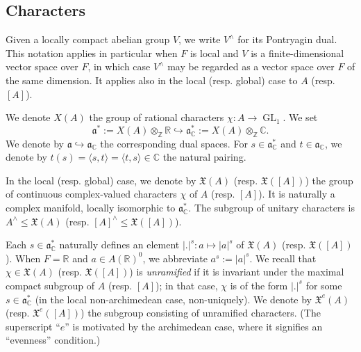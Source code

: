 \documentclass[reqno]{amsart}
\DeclareMathOperator{\GL}{GL}
\theoremstyle{plain} \newtheorem{theorem} {Theorem}
\theoremstyle{definition} \newtheorem{definition} [theorem] {Definition}
\theoremstyle{itplain} %
\numberwithin{equation}{section}
\numberwithin{theorem}{section}
\renewcommand{\leq}{\leqslant}
\begin{document}
\subsection{Characters}
Given a locally compact abelian group $V$, we write $V^\wedge$ for its Pontryagin dual.  This notation applies in particular when $F$ is local and $V$ is a finite-dimensional vector space over $F$, in which case $V^\wedge$ may be regarded as a vector space over $F$ of the same dimension.  It applies also in the local (resp. global) case to $A$ (resp. $[A]$).

We denote $X(A)$ the group of rational characters $\chi : A \rightarrow \GL_1$.  We set
\begin{equation}\label{eq:frak-a-star-X-A}
\mathfrak{a}^* := X(A) \otimes_{\mathbb{Z}} \mathbb{R} \hookrightarrow \mathfrak{a}_{\mathbb{C}}^* := X(A) \otimes_{\mathbb{Z}} \mathbb{C}.
\end{equation}
We denote by $\mathfrak{a} \hookrightarrow \mathfrak{a}_{\mathbb{C}}$ the corresponding dual spaces.  For $s \in \mathfrak{a}_{\mathbb{C}}^*$ and $t \in \mathfrak{a}_{\mathbb{C}}$, we denote by $t(s) = \langle s, t \rangle = \langle t,s  \rangle \in \mathbb{C}$ the natural pairing.

In the local (resp. global) case, we denote  by $\mathfrak{X}(A)$ (resp. $\mathfrak{X}([A])$) the group of continuous complex-valued characters $\chi$ of $A$ (resp. $[A]$).  It is naturally a complex manifold, locally isomorphic to $\mathfrak{a}^*_{\mathbb{C}}$.  The subgroup of unitary characters is $A^\wedge \leq \mathfrak{X}(A)$ (resp. $[A]^\wedge \leq \mathfrak{X}([A])$).

Each $s \in \mathfrak{a}_{\mathbb{C}}^*$ naturally defines an element $|.|^s : a \mapsto |a|^s$ of $\mathfrak{X}(A)$ (resp. $\mathfrak{X}([A])$).  When $F = \mathbb{R}$ and $a \in A(\mathbb{R})^0$, we abbreviate $a^s := |a|^s$.  We recall that $\chi \in \mathfrak{X}(A)$ (resp. $\mathfrak{X}([A])$) is \emph{unramified} if it is invariant under the maximal compact subgroup of $A$ (resp. $[A]$); in that case, $\chi$ is of the form $|.|^{s}$ for some $s \in \mathfrak{a}_{\mathbb{C}}^*$ (in the local non-archimedean case, non-uniquely).  We denote by  $\mathfrak{X}^e(A)$ (resp. $\mathfrak{X}^e([A])$) the subgroup consisting of unramified characters.  (The superscript ``$e$'' is motivated by the archimedean case, where it signifies an ``evenness'' condition.)
\end{document}
